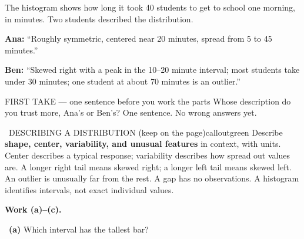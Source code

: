 \documentclass[11pt]{article}
\begin{document}


The histogram shows how long it took 40 students to get to school one morning, in minutes. Two students described the distribution.\par\smallskip \textbf{Ana:} ``Roughly symmetric, centered near 20 minutes, spread from 5 to 45 minutes.''\par \textbf{Ben:} ``Skewed right with a peak in the 10--20 minute interval; most students take under 30 minutes; one student at about 70 minutes is an outlier.''\par
\begin{center}
\end{center}
\begin{firsttakebox}{FIRST TAKE --- one sentence before you work the parts}
Whose description do you trust more, Ana's or Ben's? One sentence. No wrong answers yet.
\workspace{1.0in}
\end{firsttakebox}

\begin{callout}{\IconBook\ DESCRIBING A DISTRIBUTION (keep on the page)}{calloutgreen}
Describe \textbf{shape, center, variability, and unusual features} in context, with units. Center describes a typical response; variability describes how spread out values are. A longer right tail means skewed right; a longer left tail means skewed left. An outlier is unusually far from the rest. A gap has no observations. A histogram identifies intervals, not exact individual values.
\end{callout}

\newpage
\textbf{Work (a)--(c).}\par\smallskip

~\textbf{(a)} Which interval has the tallest bar?\par
\workspace{0.8in}
\end{document}
